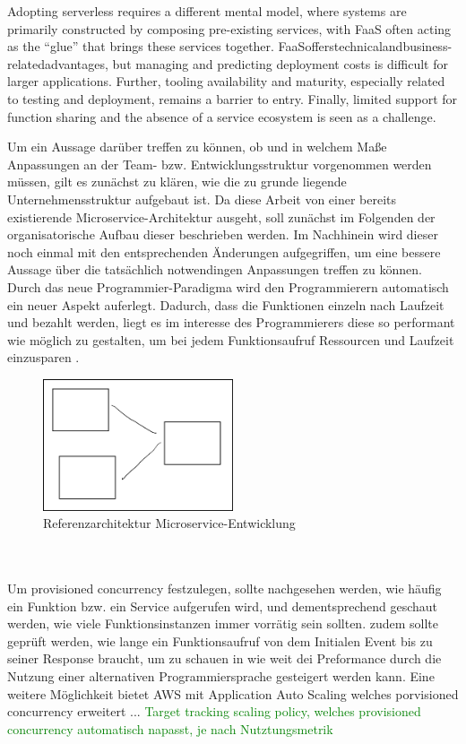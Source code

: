 \documentclass[11pt]{article}
\begin{document}
Adopting serverless requires a diﬀerent mental model, where systems are primarily constructed by composing pre-existing services, with FaaS often acting as the “glue” that brings these services together. FaaSoﬀerstechnicalandbusiness-relatedadvantages, but managing and predicting deployment costs is diﬃcult for larger applications. Further, tooling availability and maturity, especially related to testing and deployment, remains a barrier to entry. Finally, limited support for function sharing and the absence of a service ecosystem is seen as a challenge.  \cite{leitner2019mixed}

Um ein Aussage darüber treffen zu können, ob und in welchem Maße Anpassungen an der Team- bzw. Entwicklungsstruktur vorgenommen werden müssen, gilt es zunächst zu klären, wie die zu grunde liegende Unternehmensstruktur aufgebaut ist. Da diese Arbeit von einer bereits existierende Microservice-Architektur ausgeht, soll zunächst im Folgenden der organisatorische Aufbau dieser beschrieben werden. Im Nachhinein wird dieser noch einmal mit den entsprechenden Änderungen aufgegriffen, um eine bessere Aussage über die tatsächlich notwendingen Anpassungen treffen zu können.
Durch das neue Programmier-Paradigma wird den Programmierern automatisch ein neuer Aspekt auferlegt. Dadurch, dass die Funktionen einzeln nach Laufzeit und bezahlt werden, liegt es im interesse des Programmierers diese so performant wie möglich zu gestalten, um bei jedem Funktionsaufruf Ressourcen und Laufzeit einzusparen \cite{shafiei2020serverless}. 

\begin{figure}[h]
\caption{Referenzarchitektur Microservice-Entwicklung}
\centering
\includegraphics[width=0.5\textwidth]{test}
\end{figure}

\cite{van2019spec}
\cite{Yussupov2019_SystematicMappingStudyFaaS}
\cite{lee2018evaluation}
\cite{aws2020ManagingFunctions}
\\\\
Um provisioned concurrency festzulegen, sollte nachgesehen werden, wie häufig ein Funktion bzw. ein Service aufgerufen wird, und dementsprechend geschaut werden, wie viele Funktionsinstanzen immer vorrätig sein sollten. zudem sollte geprüft werden, wie lange ein Funktionsaufruf von dem Initialen Event bis zu seiner Response braucht, um zu schauen in wie weit dei Preformance durch die Nutzung einer alternativen Programmiersprache gesteigert werden kann. 
Eine weitere Möglichkeit bietet AWS mit Application Auto Scaling welches porvisioned concurrency erweitert ... \textcolor{green}{Target tracking scaling policy, welches provisioned concurrency automatisch napasst, je nach Nutztungsmetrik}
\end{document}
